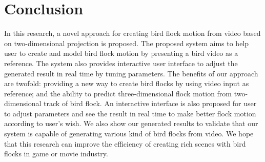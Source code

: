 \chapter{Conclusion}


In this research, a novel approach for creating bird flock motion from video based on two-dimensional projection is proposed. The proposed system aims to help user to create and model bird flock motion by presenting a bird video as a reference. The system also provides interactive user interface to adjust the generated result in real time by tuning parameters. The benefits of our approach are twofold: providing a new way to create bird flocks by using video input as reference; and the ability to predict three-dimensional flock motion from two-dimensional track of bird flock. An interactive interface is also proposed for user to adjust parameters and see the result in real time to make better flock motion according to user's wish. We also show our generated results to validate that our system  is capable of generating various kind of bird flocks from video. We hope that this research can improve the efficiency of creating rich scenes with bird flocks in game or movie industry.
